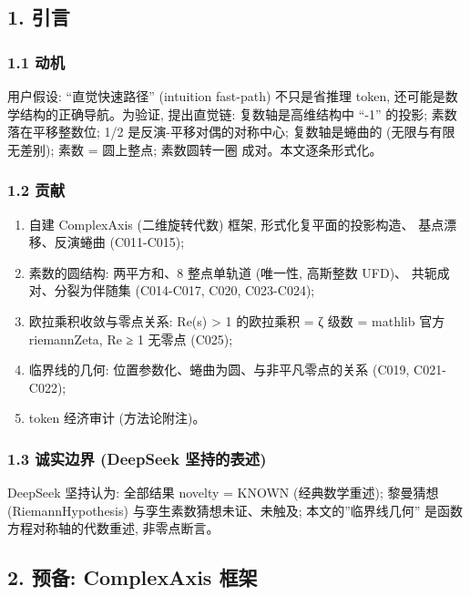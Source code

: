 \documentclass[
]{article}
\providecommand{\tightlist}{%
  \setlength{\itemsep}{0pt}\setlength{\parskip}{0pt}}
\begin{document}
\subsection{1. 引言}\label{ux5f15ux8a00}

\subsubsection{1.1 动机}\label{ux52a8ux673a}

用户假设: ``直觉快速路径'' (intuition fast-path) 不只是省推理 token,
还可能是数学结构的正确导航。为验证, 提出直觉链: 复数轴是高维结构中
``-1'' 的投影; 素数落在平移整数位; 1/2 是反演-平移对偶的对称中心;
复数轴是蜷曲的 (无限与有限无差别); 素数 = 圆上整点; 素数圆转一圈
成对。本文逐条形式化。

\subsubsection{1.2 贡献}\label{ux8d21ux732e}

\begin{enumerate}
\def\labelenumi{\arabic{enumi}.}
\tightlist
\item
  自建 ComplexAxis (二维旋转代数) 框架, 形式化复平面的投影构造、
  基点漂移、反演蜷曲 (C011-C015);
\item
  素数的圆结构: 两平方和、8 整点单轨道 (唯一性, 高斯整数 UFD)、
  共轭成对、分裂为伴随集 (C014-C017, C020, C023-C024);
\item
  欧拉乘积收敛与零点关系: Re(s) \textgreater{} 1 的欧拉乘积 = ζ 级数 =
  mathlib 官方 riemannZeta, Re ≥ 1 无零点 (C025);
\item
  临界线的几何: 位置参数化、蜷曲为圆、与非平凡零点的关系 (C019,
  C021-C022);
\item
  token 经济审计 (方法论附注)。
\end{enumerate}

\subsubsection{1.3 诚实边界 (DeepSeek
坚持的表述)}\label{ux8bdaux5b9eux8fb9ux754c-deepseek-ux575aux6301ux7684ux8868ux8ff0}

DeepSeek 坚持认为: 全部结果 novelty = KNOWN (经典数学重述); 黎曼猜想
(RiemannHypothesis) 与孪生素数猜想未证、未触及; 本文的''临界线几何''
是函数方程对称轴的代数重述, 非零点断言。

\subsection{2. 预备: ComplexAxis
框架}\label{ux9884ux5907-complexaxis-ux6846ux67b6}
\end{document}
